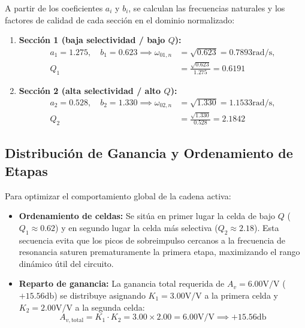 A partir de los coeficientes $a_i$ y $b_i$, se calculan las frecuencias naturales y los factores de calidad de cada
sección en el dominio normalizado:
\begin{enumerate}
    \item \textbf{Sección 1 (baja selectividad / bajo $Q$):}
        \begin{align*}
            a_1 = 1.275, \quad b_1 = 0.623 \implies 
            \omega_{01,n} &= \sqrt{0.623} = 0.7893 \unit{\radian\per\second}, \nonumber \\
            Q_1 &= \frac{\sqrt{0.623}}{1.275} = 0.6191
        \end{align*}
    \item \textbf{Sección 2 (alta selectividad / alto $Q$):}
        \begin{align*}
        a_2 = 0.528, \quad b_2 = 1.330 \implies 
        \omega_{02,n} &= \sqrt{1.330} = 1.1533 \unit{\radian\per\second}, \nonumber \\
        Q_2 &= \frac{\sqrt{1.330}}{0.528} = 2.1842
    \end{align*}
\end{enumerate}

\subsection{Distribución de Ganancia y Ordenamiento de Etapas}
Para optimizar el comportamiento global de la cadena activa:
\begin{itemize}
    \item \textbf{Ordenamiento de celdas:} Se sitúa en primer lugar la celda de bajo $Q$ ($Q_1 \approx 0.62$) y en
        segundo lugar la celda más selectiva ($Q_2 \approx 2.18$). Esta secuencia evita que los picos de sobreimpulso
        cercanos a la frecuencia de resonancia saturen prematuramente la primera etapa, maximizando el rango dinámico
        útil del circuito.
    \item \textbf{Reparto de ganancia:} La ganancia total requerida de $A_v = 6.00 \unit{\volt\per\volt}$ ($+15.56
        \unit{\decibel}$) se distribuye asignando $K_1 = 3.00 \unit{\volt\per\volt}$ a la primera celda y $K_2 = 2.00
        \unit{\volt\per\volt}$ a la segunda celda:
        \begin{equation*}
            A_{v,\text{total}} = K_1 \cdot K_2 = 3.00 \times 2.00 = 6.00 \unit{\volt\per\volt} \implies +15.56 \unit{\decibel}
        \end{equation*}
\end{itemize}

